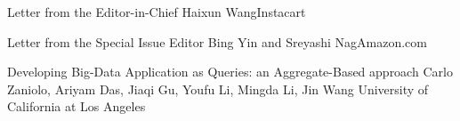 \documentclass[11pt]{article}
\begin{document}


\begin{bulletin}


%
%

\begin{lettersection}


\begin{letter}{Letter from the Editor-in-Chief}
{Haixun Wang}{Instacart}

\end{letter}
%
\newpage
%
%
\begin{letter}{Letter from the Special Issue Editor} 
{Bing Yin and Sreyashi Nag}{Amazon.com}


\end{letter}


\end{lettersection}

\begin{opinionsection}
\begin{opinion}{Developing Big-Data Application as Queries:
an Aggregate-Based approach}
  {Carlo Zaniolo, Ariyam Das, Jiaqi Gu, Youfu Li, Mingda Li, Jin Wang}
  {University of California at Los Angeles}

\end{opinion}
\end{opinionsection}


\end{bulletin}
\end{document}
